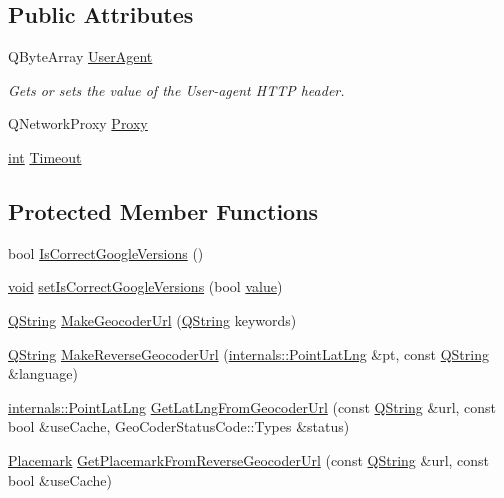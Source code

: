 \subsection*{Public Attributes}
\begin{DoxyCompactItemize}
\item 
Q\-Byte\-Array \hyperlink{group___o_p_map_widget_ga9dbf3d049cf1947db76a0c87dd0821fc}{User\-Agent}
\begin{DoxyCompactList}\small\item\em Gets or sets the value of the User-\/agent H\-T\-T\-P header. \end{DoxyCompactList}\item 
Q\-Network\-Proxy \hyperlink{group___o_p_map_widget_ga4851a6205d1885048a3417f736ec8679}{Proxy}
\item 
\hyperlink{ioapi_8h_a787fa3cf048117ba7123753c1e74fcd6}{int} \hyperlink{group___o_p_map_widget_gaee21c04663fde2b41c6d471456dc7325}{Timeout}
\end{DoxyCompactItemize}
\subsection*{Protected Member Functions}
\begin{DoxyCompactItemize}
\item 
bool \hyperlink{group___o_p_map_widget_ga5ccccf5ffb4b44422b6ca9596d0972f9}{Is\-Correct\-Google\-Versions} ()
\item 
\hyperlink{group___u_a_v_objects_plugin_ga444cf2ff3f0ecbe028adce838d373f5c}{void} \hyperlink{group___o_p_map_widget_ga7770edaf0b058ba1317da2a627219fb1}{set\-Is\-Correct\-Google\-Versions} (bool \hyperlink{glext_8h_aa0e2e9cea7f208d28acda0480144beb0}{value})
\item 
\hyperlink{group___u_a_v_objects_plugin_gab9d252f49c333c94a72f97ce3105a32d}{Q\-String} \hyperlink{group___o_p_map_widget_ga972a8b02da4bbabc676cf8c0aecff2da}{Make\-Geocoder\-Url} (\hyperlink{group___u_a_v_objects_plugin_gab9d252f49c333c94a72f97ce3105a32d}{Q\-String} keywords)
\item 
\hyperlink{group___u_a_v_objects_plugin_gab9d252f49c333c94a72f97ce3105a32d}{Q\-String} \hyperlink{group___o_p_map_widget_gad12026ac0e1b17ce9cdbd8da9b4521db}{Make\-Reverse\-Geocoder\-Url} (\hyperlink{structinternals_1_1_point_lat_lng}{internals\-::\-Point\-Lat\-Lng} \&pt, const \hyperlink{group___u_a_v_objects_plugin_gab9d252f49c333c94a72f97ce3105a32d}{Q\-String} \&language)
\item 
\hyperlink{structinternals_1_1_point_lat_lng}{internals\-::\-Point\-Lat\-Lng} \hyperlink{group___o_p_map_widget_ga5fcebca86495c19cd0feda82e7bb756d}{Get\-Lat\-Lng\-From\-Geocoder\-Url} (const \hyperlink{group___u_a_v_objects_plugin_gab9d252f49c333c94a72f97ce3105a32d}{Q\-String} \&url, const bool \&use\-Cache, Geo\-Coder\-Status\-Code\-::\-Types \&status)
\item 
\hyperlink{classcore_1_1_placemark}{Placemark} \hyperlink{group___o_p_map_widget_ga6f4535cb1c90494c811786af2dbac194}{Get\-Placemark\-From\-Reverse\-Geocoder\-Url} (const \hyperlink{group___u_a_v_objects_plugin_gab9d252f49c333c94a72f97ce3105a32d}{Q\-String} \&url, const bool \&use\-Cache)
\end{DoxyCompactItemize}
